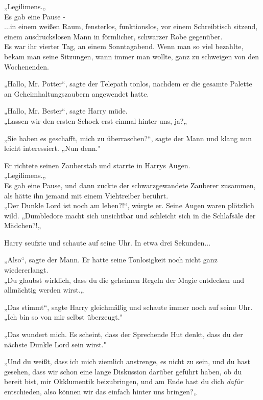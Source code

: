{„Legilimens.„\\ Es gab eine Pause -\\ ...in einem weißen Raum, fensterlos, funktionslos, vor einem Schreibtisch sitzend, einem ausdruckslosen Mann in förmlicher, schwarzer Robe gegenüber.\\ Es war ihr vierter Tag, an einem Sonntagabend. Wenn man so viel bezahlte, bekam man seine Sitzungen, wann immer man wollte, ganz zu schweigen von den Wochenenden.

„Hallo, Mr. Potter“, sagte der Telepath tonlos, nachdem er die gesamte Palette an Geheimhaltungszaubern angewendet hatte.

„Hallo, Mr. Bester“, sagte Harry müde.\\ „Lassen wir den ersten Schock erst einmal hinter uns, ja?„

„Sie haben es geschafft, mich zu überraschen?“, sagte der Mann und klang nun leicht interessiert. „Nun denn."

Er richtete seinen Zauberstab und starrte in Harrys Augen.\\ „Legilimens.„\\ Es gab eine Pause, und dann zuckte der schwarzgewandete Zauberer zusammen, als hätte ihn jemand mit einem Viehtreiber berührt.\\ „Der Dunkle Lord ist noch am leben?!“, würgte er. Seine Augen waren plötzlich wild. „Dumbledore macht sich unsichtbar und schleicht sich in die Schlafsäle der Mädchen?!„

Harry seufzte und schaute auf seine Uhr. In etwa drei Sekunden...

„Also“, sagte der Mann. Er hatte seine Tonlosigkeit noch nicht ganz wiedererlangt.\\ „Du glaubst wirklich, dass du die geheimen Regeln der Magie entdecken und allmächtig werden wirst.„

„Das stimmt“, sagte Harry gleichmäßig und schaute immer noch auf seine Uhr.\\ „Ich bin so von mir selbst überzeugt."

„Das wundert mich. Es scheint, dass der Sprechende Hut denkt, dass du der nächste Dunkle Lord sein wirst."

„Und du weißt, dass ich mich ziemlich anstrenge, es nicht zu sein, und du hast gesehen, dass wir schon eine lange Diskussion darüber geführt haben, ob du bereit bist, mir Okklumentik beizubringen, und am Ende hast du dich \emph{dafür} entschieden, also können wir das einfach hinter uns bringen?„

}

